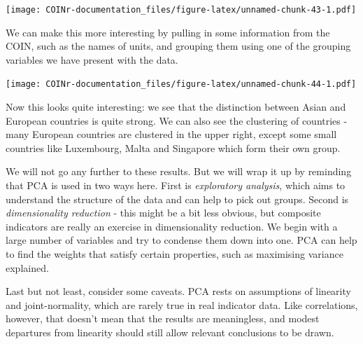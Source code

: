\documentclass[
]{book}
\newenvironment{Shaded}{\begin{snugshade}}{\end{snugshade}}
\newcommand{\AttributeTok}[1]{\textcolor[rgb]{0.77,0.63,0.00}{#1}}
\newcommand{\CommentTok}[1]{\textcolor[rgb]{0.56,0.35,0.01}{\textit{#1}}}
\newcommand{\FunctionTok}[1]{\textcolor[rgb]{0.00,0.00,0.00}{#1}}
\newcommand{\NormalTok}[1]{#1}
\newcommand{\SpecialCharTok}[1]{\textcolor[rgb]{0.00,0.00,0.00}{#1}}
\begin{document}
\texttt{[image: COINr-documentation\_files/figure-latex/unnamed-chunk-43-1.pdf]}

We can make this more interesting by pulling in some information from the COIN, such as the names of units, and grouping them using one of the grouping variables we have present with the data.

\begin{Shaded}
\end{Shaded}

\texttt{[image: COINr-documentation\_files/figure-latex/unnamed-chunk-44-1.pdf]}

Now this looks quite interesting: we see that the distinction between Asian and European countries is quite strong. We can also see the clustering of countries - many European countries are clustered in the upper right, except some small countries like Luxembourg, Malta and Singapore which form their own group.

We will not go any further to these results. But we will wrap it up by reminding that PCA is used in two ways here. First is \emph{exploratory analysis}, which aims to understand the structure of the data and can help to pick out groups. Second is \emph{dimensionality reduction} - this might be a bit less obvious, but composite indicators are really an exercise in dimensionality reduction. We begin with a large number of variables and try to condense them down into one. PCA can help to find the weights that satisfy certain properties, such as maximising variance explained.

Last but not least, consider some caveats. PCA rests on assumptions of linearity and joint-normality, which are rarely true in real indicator data. Like correlations, however, that doesn't mean that the results are meaningless, and modest departures from linearity should still allow relevant conclusions to be drawn.
\end{document}
